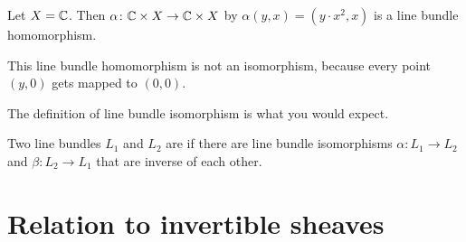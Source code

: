 \begin{example}
	Let $X = \mathbb C$. Then $\alpha \colon \mathbb C \times X \to \mathbb C \times X$ by $\alpha(y, x) =
	(y \cdot x^2, x)$ is a line bundle homomorphism.

	This line bundle homomorphism is not an isomorphism, because every point $(y, 0)$ gets mapped to
	$(0, 0)$.
\end{example}

The definition of line bundle isomorphism is what you would expect.
\begin{definition}
	Two line bundles $L_1$ and $L_2$ are  if there are line bundle isomorphisms
	$\alpha \colon L_1 \to L_2$ and $\beta \colon L_2 \to L_1$ that are inverse of each other.
\end{definition}

\section{Relation to invertible sheaves}
